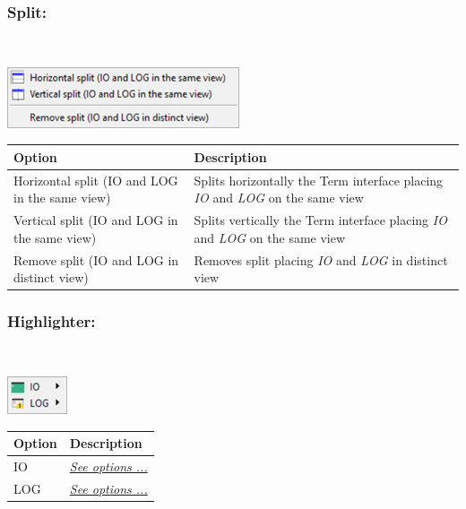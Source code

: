 \hypertarget{menu_r_term_split}{}
\subsubsection{Split:}\\

\includegraphics[scale=0.50]{./res/menu_r_term_split.png}\\

\begin{scriptsize}
  \begin{tabularx}{\headwidth}{>{\hsize=0.6\hsize}X>{\hsize=0.7\hsize}X}\\
    \hline
    \textbf{Option} & \textbf{Description} \\
    \hline
    Horizontal split (IO and LOG in the same view) & Splits horizontally the Term interface
     placing \textit{IO} and \textit{LOG} on the same view \\
    Vertical split (IO and LOG in the same view) & Splits vertically the Term interface
     placing \textit{IO} and \textit{LOG} on the same view \\
    Remove split (IO and LOG in distinct view) & Removes split placing
     \textit{IO} and \textit{LOG} in distinct view \\
    \hline
  \end{tabularx}
\end{scriptsize}

\hypertarget{menu_r_term_highlighter}{}
\subsubsection{Highlighter:}\\

\includegraphics[scale=0.50]{./res/menu_r_term_highlighter.png}\\

\begin{scriptsize}
  \begin{tabularx}{\textwidth}{>{\hsize=0.3\hsize}X>{\hsize=0.7\hsize}X}\\
    \hline
    \textbf{Option} & \textbf{Description} \\
    \hline
    IO & \textit{\href{\#menu\_r\_term\_highlighter\_IO}{See options ...}} \\
    LOG & \textit{\href{\#menu\_r\_term\_highlighter\_Log}{See options ...}} \\
    \hline
  \end{tabularx}
\end{scriptsize}


